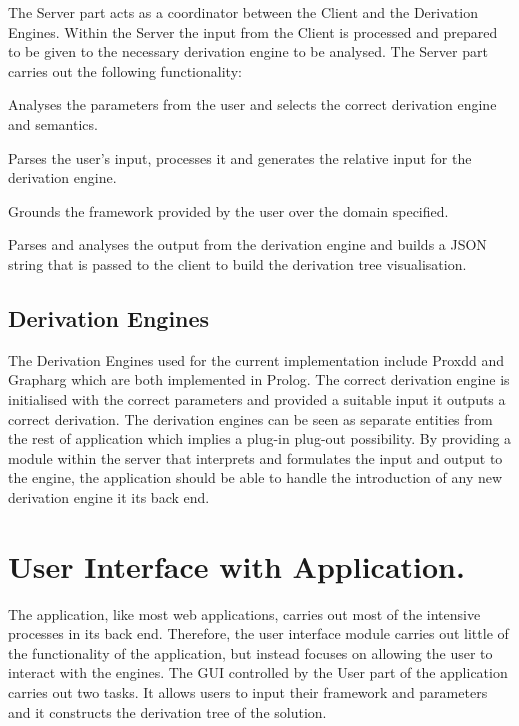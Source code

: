 The Server part acts as a coordinator between the Client and the Derivation Engines. Within the Server the input from the Client is processed and prepared to be given to the necessary derivation engine to be analysed. The Server part carries out the following functionality:

\begin{itemize*}
\item Analyses the parameters from the user and selects the correct derivation engine and semantics.
\item Parses the user's input, processes it and generates the relative input for the derivation engine.
\item Grounds the framework provided by the user over the domain specified.
\item Parses and analyses the output from the derivation engine and builds a JSON string that is passed to the client to build the derivation tree visualisation.
\end{itemize*}

\subsection{Derivation Engines}

The Derivation Engines used for the current implementation include Proxdd and Grapharg which are both implemented in Prolog. The correct derivation engine is initialised with the correct parameters and provided a suitable input it outputs a correct derivation. The derivation engines can be seen as separate entities from the rest of application which implies a plug-in plug-out possibility. By providing a module within the server that interprets and formulates the input and output to the engine, the application should be able to handle the introduction of any new derivation engine it its back end.

\section{User Interface with Application.}

The application, like most web applications, carries out most of the intensive processes in its back end. Therefore, the user interface module carries out little of the functionality of the application, but instead focuses on allowing the user to interact with the engines. The GUI controlled by the User part of the application carries out two tasks. It allows users to input their framework and parameters and it constructs the derivation tree of the solution.

